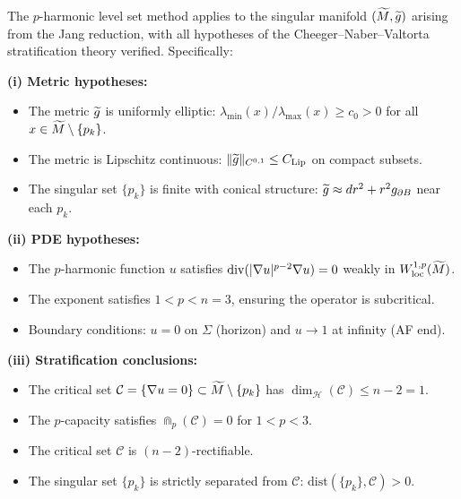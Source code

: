 \begin{theorem}\label{thm:CompleteStratification}
The $p$-harmonic level set method applies to the singular manifold $(\widetilde{M}, \widetilde{g})$ arising from the Jang reduction, with all hypotheses of the Cheeger--Naber--Valtorta stratification theory verified. Specifically:

\textbf{(i) Metric hypotheses:}
\begin{itemize}
    \item The metric $\widetilde{g}$ is uniformly elliptic: $\lambda_{\min}(x) / \lambda_{\max}(x) \ge c_0 > 0$ for all $x \in \widetilde{M} \setminus \{p_k\}$.
    \item The metric is Lipschitz continuous: $\|\widetilde{g}\|_{C^{0,1}} \le C_{\mathrm{Lip}}$ on compact subsets.
    \item The singular set $\{p_k\}$ is finite with conical structure: $\widetilde{g} \approx dr^2 + r^2 g_{\partial B}$ near each $p_k$.
\end{itemize}

\textbf{(ii) PDE hypotheses:}
\begin{itemize}
    \item The $p$-harmonic function $u$ satisfies $\mathrm{div}(|\nabla u|^{p-2} \nabla u) = 0$ weakly in $W^{1,p}_{\mathrm{loc}}(\widetilde{M})$.
    \item The exponent satisfies $1 < p < n = 3$, ensuring the operator is subcritical.
    \item Boundary conditions: $u = 0$ on $\Sigma$ (horizon) and $u \to 1$ at infinity (AF end).
\end{itemize}

\textbf{(iii) Stratification conclusions:}
\begin{itemize}
    \item The critical set $\mathcal{C} = \{\nabla u = 0\} \subset \widetilde{M} \setminus \{p_k\}$ has $\dim_{\mathcal{H}}(\mathcal{C}) \le n - 2 = 1$.
    \item The $p$-capacity satisfies $\Cap_p(\mathcal{C}) = 0$ for $1 < p < 3$.
    \item The critical set $\mathcal{C}$ is $(n-2)$-rectifiable.
    \item The singular set $\{p_k\}$ is strictly separated from $\mathcal{C}$: $\mathrm{dist}(\{p_k\}, \mathcal{C}) > 0$.
\end{itemize}


\end{theorem}
